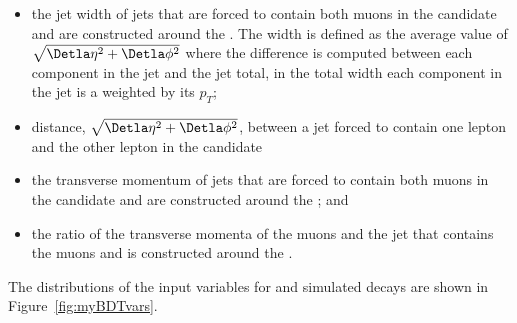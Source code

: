 \begin{itemize}
\item  the jet width of jets that are forced to contain both muons in the \bsmumu candidate and are constructed around the \bs. The width is defined as the average value of $\sqrt{\Detla \eta^2 + \Detla \phi^2}$ where the difference is computed between each component in the jet and the jet total, in the total width each component in the jet is a weighted by its $p_{T}$;
\item distance, $\sqrt{\Detla \eta^2 + \Detla \phi^2}$, between a jet forced to contain one lepton and the other lepton in the \bsmumu candidate
\item the transverse momentum of jets that are forced to contain both muons in the \bsmumu candidate and are constructed around the \bs; and 
\item the ratio of the transverse momenta of the muons and the jet that contains the muons and is constructed around the \bs.
\end{itemize}

The distributions of the input variables for \bsmumu and  simulated decays are shown in Figure~\ref{fig:myBDTvars}.

